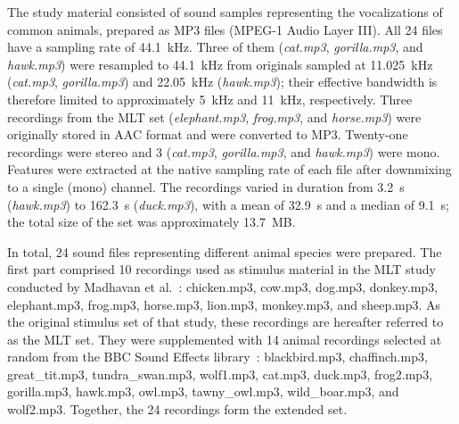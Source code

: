 \documentclass[preprint,12pt]{elsarticle}
\begin{document}
The study material consisted of sound samples representing the vocalizations of common animals, prepared as MP3 files (MPEG-1 Audio Layer III). All 24 files have a sampling rate of 44.1~kHz. Three of them (\textit{cat.mp3}, \textit{gorilla.mp3}, and \textit{hawk.mp3}) were resampled to 44.1~kHz from originals sampled at 11.025~kHz (\textit{cat.mp3}, \textit{gorilla.mp3}) and 22.05~kHz (\textit{hawk.mp3}); their effective bandwidth is therefore limited to approximately 5~kHz and 11~kHz, respectively. Three recordings from the MLT set (\textit{elephant.mp3}, \textit{frog.mp3}, and \textit{horse.mp3}) were originally stored in AAC format and were converted to MP3. Twenty-one recordings were stereo and 3 (\textit{cat.mp3}, \textit{gorilla.mp3}, and \textit{hawk.mp3}) were mono. Features were extracted at the native sampling rate of each file after downmixing to a single (mono) channel. The recordings varied in duration from 3.2~s (\textit{hawk.mp3}) to 162.3~s (\textit{duck.mp3}), with a mean of 32.9~s and a median of 9.1~s; the total size of the set was approximately 13.7~MB.

In total, 24 sound files representing different animal species were prepared. The first part comprised 10 recordings used as stimulus material in the MLT study conducted by Madhavan et al.~\cite{MadhavanWrobel2024MLT}: chicken.mp3, cow.mp3, dog.mp3, donkey.mp3, elephant.mp3, frog.mp3, horse.mp3, lion.mp3, monkey.mp3, and sheep.mp3. As the original stimulus set of that study, these recordings are hereafter referred to as the MLT set. They were supplemented with 14 animal recordings selected at random from the BBC Sound Effects library~\cite{bbcrewind_soundeffects}: blackbird.mp3, chaffinch.mp3, great\_tit.mp3, tundra\_swan.mp3, wolf1.mp3, cat.mp3, duck.mp3, frog2.mp3, gorilla.mp3, hawk.mp3, owl.mp3, tawny\_owl.mp3, wild\_boar.mp3, and wolf2.mp3. Together, the 24 recordings form the extended set.
\end{document}
